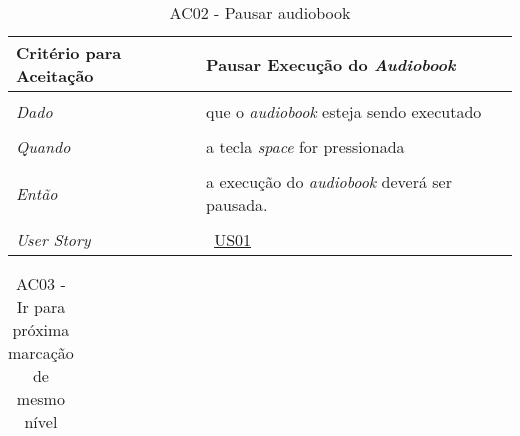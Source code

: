 \begin{apendicesenv}
\begin{table}[ht]
\begin{center}
\begin{tabularx}{\textwidth}{|lX|l|}
\end{tabularx}
\end{center}
\label{tab:us01a1}
\end{table}


\begin{table}[ht]
\centering
\caption{AC02 - Pausar audiobook}
\vspace{0.1cm}
\begin{center}
\begin{tabularx}{\textwidth}{|lX|l|}

\hline
\textbf{Critério para Aceitação} & Pausar Execução do \textit{Audiobook} \\
\hline
 & \\
\textit{Dado} & que o \textit{audiobook} esteja sendo executado \\
 & \\
\textit{Quando} & a tecla \textit{space} for pressionada \\
 & \\
\textit{Então} & a execução do \textit{audiobook} deverá ser pausada. \\
 & \\
\hline
\textit{User Story} & ~\hyperref[tab:us01]{US01} \\
\hline

\end{tabularx}
\end{center}
\label{tab:us01a2}
\end{table}


\begin{table}[ht]
\centering
\caption{AC03 - Ir para próxima marcação de mesmo nível}
\vspace{0.1cm}
\begin{center}
\begin{tabularx}{\textwidth}{|lX|l|}


\end{tabularx}
\end{center}
\end{table}
\end{apendicesenv}
